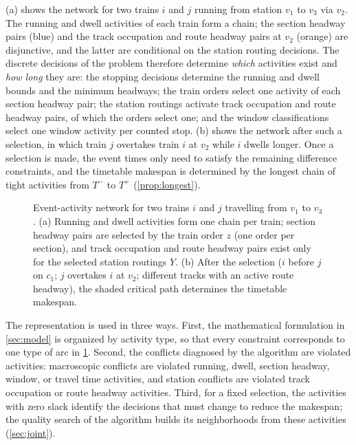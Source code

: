 (a) shows the network for two trains $i$ and $j$ running from station $v_1$ to $v_3$ via $v_2$. The running and dwell activities of each train form a chain; the section headway pairs (blue) and the track occupation and route headway pairs at $v_2$ (orange) are disjunctive, and the latter are conditional on the station routing decisions. The discrete decisions of the problem therefore determine \emph{which} activities exist and \emph{how long} they are: the stopping decisions determine the running and dwell bounds and the minimum headways; the train orders select one activity of each section headway pair; the station routings activate track occupation and route headway pairs, of which the orders select one; and the window classifications select one window activity per counted stop. (b) shows the network after such a selection, in which train $j$ overtakes train $i$ at $v_2$ while $i$ dwells longer. Once a selection is made, the event times only need to satisfy the remaining difference constraints, and the timetable makespan is determined by the longest chain of tight activities from $T^-$ to $T^+$ (\cref{prop:longest}).

\begin{figure}[tbp]
\centering
\resizebox{\textwidth}{!}{}
\caption{Event-activity network for two trains $i$ and $j$ travelling from $v_1$ to $v_3$. (a) Running and dwell activities form one chain per train; section headway pairs are selected by the train order $z$ (one order per section), and track occupation and route headway pairs exist only for the selected station routings $Y$. (b) After the selection ($i$ before $j$ on $c_1$; $j$ overtakes $i$ at $v_2$; different tracks with an active route headway), the shaded critical path determines the timetable makespan.}\label{fig:ean}
\end{figure}

The representation is used in three ways. First, the mathematical formulation in \cref{sec:model} is organized by activity type, so that every constraint corresponds to one type of arc in \cref{fig:ean}. Second, the conflicts diagnosed by the algorithm are violated activities: macroscopic conflicts are violated running, dwell, section headway, window, or travel time activities, and station conflicts are violated track occupation or route headway activities. Third, for a fixed selection, the activities with zero slack identify the decisions that must change to reduce the makespan; the quality search of the algorithm builds its neighborhoods from these activities (\cref{sec:joint}).

